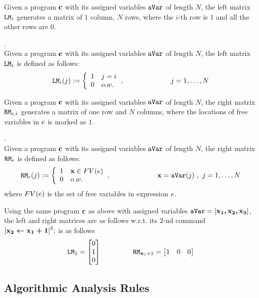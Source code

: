 \documentclass[a4paper,11pt]{article}
\begin{document}
Given a program  ${\boldsymbol{\mathbf{c}}}$ with its assigned variables $\mathtt{aVar}$ of length $N$,
the left matrix $\mathtt{LM}_i$ generates a matrix of $1$ column, $N$ rows, 
where the $i$-th row is $1$ and all the other rows are $0$.
%
\begin{defn}.
\\
Given a program  ${\boldsymbol{\mathbf{c}}}$ with its assigned variables $\mathtt{aVar}$ of length $N$, 
the left matrix $\mathtt{LM}_i$ is defined as follows:
\[
	\lMtrix_i(j) : = 
	\left
	\{
	\begin{array}{ll}
	1 & j = i \\
	0 & o.w.
	\end{array}
	\right.,
	~~~~~~~~~~~~~~~~~~~~ 
	j = 1, \ldots, N
\]
\end{defn}
%
Given a program  ${\boldsymbol{\mathbf{c}}}$ with its assigned variables $\mathtt{aVar}$ of length $N$,
the right matrix $\mathtt{RM}_{e, i}$ generates a matrix of one row and $N$ columns, 
where the locations of free variables in $e$ is marked as $1$. 
%
%
\begin{defn}.
\\
Given a program  ${\boldsymbol{\mathbf{c}}}$ with its assigned variables $\mathtt{aVar}$ of length $N$, 
the right matrix $\mathtt{RM}_{e}$ is defined as follows:
\[
	\rMtrix_{\expr}(j) : = 
	\left\{
	\begin{array}{ll}
	1 & \ssa{x} \in FV(\expr) 
	\\
	0 & o.w.
	\end{array}
	\right.,
	~~~~~~~~~~~~~~~~~~~~ 
	\ssa{x} = \avar(j) ~ , ~ j = 1, \ldots, N
\]
where $FV(e)$ is the set of free variables in expression $e$.
%
%
\end{defn}
%
Using the same program ${\boldsymbol{\mathbf{c}}}$ as above with assigned variables $\mathtt{aVar} = [ {\boldsymbol{\mathbf{x_1 , x_2 , x_3}}} ] $,
the left and right matrices are as follows w.r.t. its $2$-nd command 
$\left[\ssa{\assign {x_2} {x_1 + 1}}	\right]^2;$ 
is as follows
\[
\lMtrix_1 = \left[ \begin{matrix}
 0   \\
 1 	 \\
 0   \\
\end{matrix}   \right ] 
~~~~~~~~~~~~~~
\rMtrix_{\ssa{x}_1 + 1}
= \left[ \begin{matrix} 
   1 & 0 & 0 \\
\end{matrix}  \right]
\]
%
%
%
\subsection{Algorithmic Analysis Rules}
%
\end{document}
